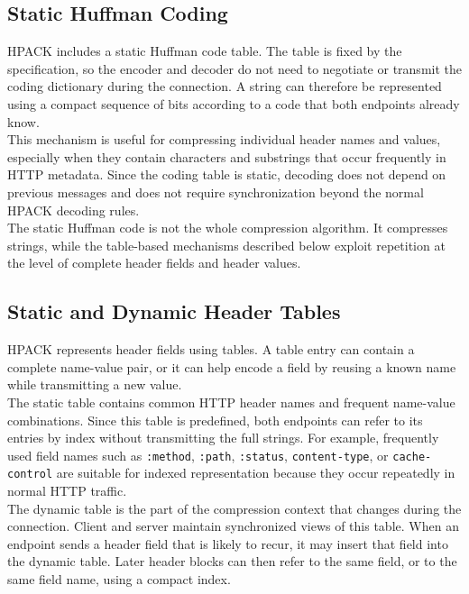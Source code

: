 \documentclass{scrbook}
\begin{document}
\subsection{Static Huffman Coding}

HPACK includes a static Huffman code table. The table is fixed by the specification, so the encoder and decoder do not need to negotiate or transmit the coding dictionary during the connection. A string can therefore be represented using a compact sequence of bits according to a code that both endpoints already know.\\

This mechanism is useful for compressing individual header names and values, especially when they contain characters and substrings that occur frequently in HTTP metadata. Since the coding table is static, decoding does not depend on previous messages and does not require synchronization beyond the normal HPACK decoding rules.\\

The static Huffman code is not the whole compression algorithm. It compresses strings, while the table-based mechanisms described below exploit repetition at the level of complete header fields and header values.

\subsection{Static and Dynamic Header Tables}

HPACK represents header fields using tables. A table entry can contain a complete name-value pair, or it can help encode a field by reusing a known name while transmitting a new value.\\

The static table contains common HTTP header names and frequent name-value combinations. Since this table is predefined, both endpoints can refer to its entries by index without transmitting the full strings. For example, frequently used field names such as \texttt{:method}, \texttt{:path}, \texttt{:status}, \texttt{content-type}, or \texttt{cache-control} are suitable for indexed representation because they occur repeatedly in normal HTTP traffic.\\

The dynamic table is the part of the compression context that changes during the connection. Client and server maintain synchronized views of this table. When an endpoint sends a header field that is likely to recur, it may insert that field into the dynamic table. Later header blocks can then refer to the same field, or to the same field name, using a compact index.\\
\end{document}
